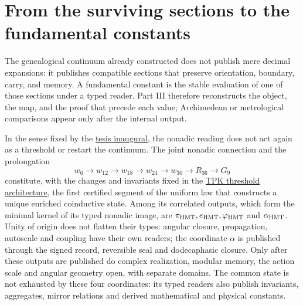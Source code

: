 \section*{From the surviving sections to the fundamental constants}

The genealogical continuum already constructed does not publish mere decimal expansions: it publishes compatible sections that preserve orientation, boundary, carry, and memory. A fundamental constant is the stable evaluation of one of those sections under a typed reader. Part III therefore reconstructs the object, the map, and the proof that precede each value; Archimedean or metrological comparisons appear only after the internal output.

In the sense fixed by the
\hyperref[sec:tesis-inaugural-helicoidal-hmt-md]{tesis inaugural}, the nonadic
reading does not act again as a threshold or restart the continuum. The joint nonadic connection and the prolongation
\[
w_6\longrightarrow w_{12}\longrightarrow w_{18}\longrightarrow w_{24}\longrightarrow w_{30}\longrightarrow R_{36}\longrightarrow G_9
\]
constitute, with the changes and invariants fixed in the
\hyperref[sec:umbrales-prolongacion-tpk-inaugural]{TPK threshold
architecture}, the first certified segment of the uniform law that constructs a unique
enriched coinductive state. Among its correlated outputs, which form
the minimal kernel of its typed nonadic image, are
\(\pi_{\rm HMT},e_{\rm HMT},\varphi_{\rm HMT}\) and \(\alpha_{\rm HMT}\). Unity of origin does not flatten their types: angular closure, propagation, autoscale and coupling have their own readers; the coordinate \(\alpha\) is published through the signed record, reversible seal and dodecaphasic closure. Only after these outputs are published do complex realization, modular memory, the action scale and angular geometry open, with separate domains. The common state is not exhausted by these four coordinates: its typed readers also publish invariants, aggregates, mirror relations and derived mathematical and physical constants.

